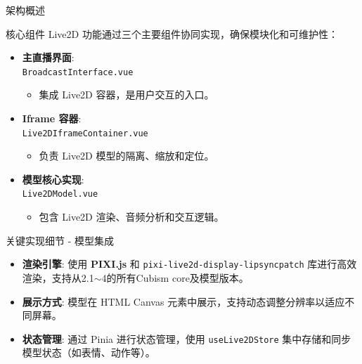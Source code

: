 \documentclass{beamer}
\begin{document}
	\begin{frame}{架构概述}
		\begin{block}{核心组件}
			Live2D 功能通过三个主要组件协同实现，确保模块化和可维护性：
		\end{block}
		\begin{itemize}
			\item<1-> \textbf{主直播界面}:\\ \texttt{BroadcastInterface.vue}
			\begin{itemize}
				\item 集成 Live2D 容器，是用户交互的入口。
			\end{itemize}
			\bigskip
			\item<2-> \textbf{Iframe 容器}:\\ \texttt{Live2DIframeContainer.vue}
			\begin{itemize}
				\item 负责 Live2D 模型的隔离、缩放和定位。
			\end{itemize}
			\bigskip
			\item<3-> \textbf{模型核心实现}:\\ \texttt{Live2DModel.vue}
			\begin{itemize}
				\item 包含 Live2D 渲染、音频分析和交互逻辑。
			\end{itemize}
		\end{itemize}
	\end{frame}
	\begin{frame}{关键实现细节 - 模型集成}
		\begin{itemize}
			\item \textbf{渲染引擎}: 使用 \textbf{PIXI.js} 和 \texttt{pixi-live2d-display-lipsyncpatch} 库进行高效渲染，支持从2.1$\sim$4的所有Cubism core及模型版本。
			
			\pause
			\item \textbf{展示方式}: 模型在 HTML Canvas 元素中展示，支持动态调整分辨率以适应不同屏幕。
			\pause
			\item \textbf{状态管理}: 通过 Pinia 进行状态管理，使用 \texttt{useLive2DStore} 集中存储和同步模型状态（如表情、动作等）。
		\end{itemize}
	\end{frame}
	
	
	
\end{document}
